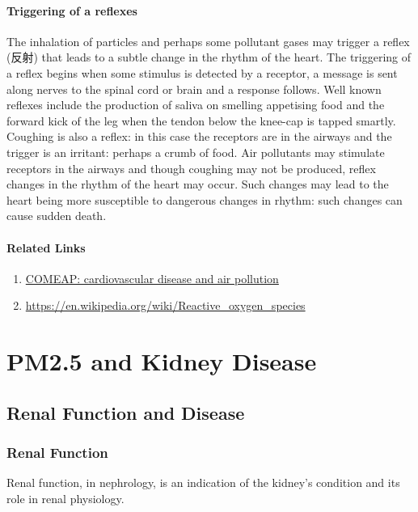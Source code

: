 \documentclass{article}
\begin{document}
\paragraph{Triggering of a reflexes} The inhalation of particles and perhaps some pollutant gases may trigger a reflex (反射) that leads to a subtle change in the rhythm of the heart. The triggering of a reflex begins when some stimulus is detected by a receptor, a message is sent along nerves to the spinal cord or brain and a response follows. Well known reflexes include the production of saliva on smelling appetising food and the forward kick of the leg when the tendon below the knee-cap is tapped smartly. Coughing is also a reflex: in this case the receptors are in the airways and the trigger is an irritant: perhaps a crumb of food. Air pollutants may stimulate receptors in the airways and though coughing may not be produced, reflex changes in the rhythm of the heart may occur. Such changes may lead to the heart being more susceptible to dangerous changes in rhythm: such changes can cause sudden death. 

\paragraph{Related Links}

\begin{enumerate}
    \item \href{https://www.gov.uk/government/publications/comeap-cardiovascular-disease-and-air-pollution}{COMEAP: cardiovascular disease and air pollution}
    \item \url{https://en.wikipedia.org/wiki/Reactive_oxygen_species}
\end{enumerate}

\section{PM2.5 and Kidney Disease}

\subsection{Renal Function and Disease}

\subsubsection{Renal Function}
Renal function, in nephrology, is an indication of the kidney's condition and its role in renal physiology. 
\end{document}
